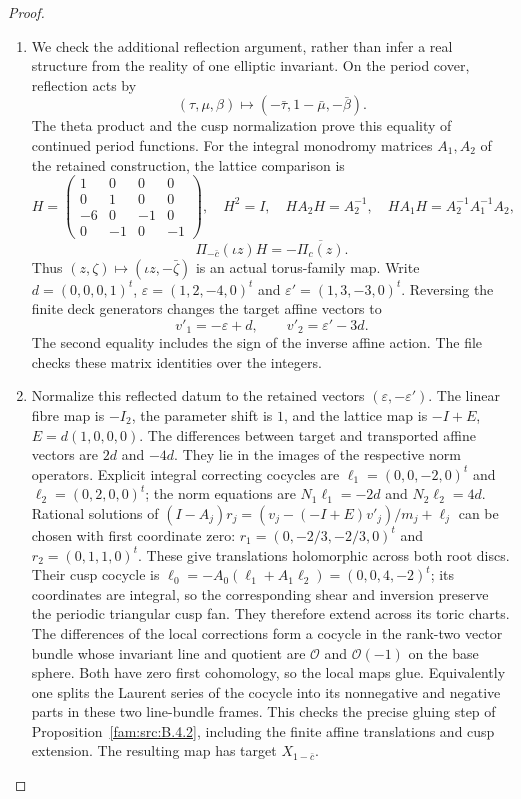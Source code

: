 \begin{proof}
\begin{enumerate}[label=\arabic*.,leftmargin=*]
\item We check the additional reflection argument, rather than infer a real
structure from the reality of one elliptic invariant. On the period
cover, reflection acts by
\[
 (\tau,\mu,\beta)\longmapsto(-\bar\tau,1-\bar\mu,-\bar\beta).
\]
The theta product and the cusp normalization prove this equality of
continued period functions. For the integral monodromy matrices
$A_1,A_2$ of the retained construction, the lattice comparison is
\[
 H=\begin{pmatrix}1&0&0&0\\0&1&0&0\\-6&0&-1&0\\0&-1&0&-1\end{pmatrix},
 \quad H^2=I,\quad HA_2H=A_2^{-1},\quad
 HA_1H=A_2^{-1}A_1^{-1}A_2,
\]
\[
 \Pi_{-\bar c}(\iota z)H=-\overline{\Pi_c(z)}.
\]
Thus $(z,\zeta)\mapsto(\iota z,-\bar\zeta)$ is an actual torus-family
map. Write $d=(0,0,0,1)^t$, $\varepsilon=(1,2,-4,0)^t$ and
$\varepsilon'=(1,3,-3,0)^t$. Reversing the finite deck generators
changes the target affine vectors to
\[
 v'_1=-\varepsilon+d,\qquad v'_2=\varepsilon'-3d.
\]
The second equality includes the sign of the inverse affine action.
The file  checks these matrix identities
over the integers.

\item Normalize this reflected datum to the retained vectors
$(\varepsilon,-\varepsilon')$. The linear fibre map is $-I_2$, the
parameter shift is $1$, and the lattice map is $-I+E$,
$E=d(1,0,0,0)$. The differences between target and transported affine
vectors are $2d$ and $-4d$. They lie in the images of the respective
norm operators. Explicit integral correcting cocycles are
$\ell_1=(0,0,-2,0)^t$ and $\ell_2=(0,2,0,0)^t$; the norm equations
are $N_1\ell_1=-2d$ and $N_2\ell_2=4d$. Rational solutions of
$(I-A_j)r_j=(v_j-(-I+E)v'_j)/m_j+\ell_j$ can be chosen with first
coordinate zero: $r_1=(0,-2/3,-2/3,0)^t$ and
$r_2=(0,1,1,0)^t$. These give translations holomorphic across both
root discs. Their cusp cocycle is
$\ell_0=-A_0(\ell_1+A_1\ell_2)=(0,0,4,-2)^t$; its coordinates are
integral, so the corresponding shear and inversion preserve the
periodic triangular cusp fan. They therefore extend across its toric
charts. The differences of the local corrections form a cocycle in
the rank-two vector bundle whose invariant line and quotient are
$\mathcal O$ and $\mathcal O(-1)$ on the base sphere. Both have zero
first cohomology, so the local maps glue. Equivalently one splits the
Laurent series of the cocycle into its nonnegative and negative
parts in these two line-bundle frames. This checks the precise
gluing step of Proposition~\ref{fam:src:B.4.2}, including the finite affine translations
and cusp extension. The resulting map has target $X_{1-\bar c}$.


\end{enumerate}
\end{proof}
